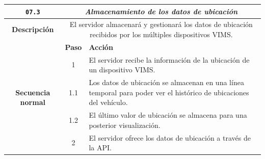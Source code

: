 \begin{table}[H]
  \centering
  \begin{tabularx}{\textwidth}{|c|c|X|}
    \hline
    \texttt{07.3}                              & \multicolumn{2}{c|}{\textit{Almacenamiento de los datos de ubicación}}                                                                                                                                                                                                        \\
    \hline
    \textbf{Descripción}                       & \multicolumn{2}{X|}{El servidor almacenará y gestionará los datos de ubicación recibidos por los múltiples dispositivos \ac{VIMS}.}                                                                                                                                           \\
    \hline
    \multirow{8}{*}{\textbf{Secuencia normal}} & \textbf{Paso}                                                                                                                       & \textbf{Acción}                                                                                                                         \\
    \cline{2-3}
                                               & 1                                                                                                                                   & \multicolumn{1}{L|}{El servidor recibe la información de la ubicación de un dispositivo \ac{VIMS}.}                                     \\
    \cline{2-3}
                                               & 1.1                                                                                                                                 & \multicolumn{1}{L|}{Los datos de ubicación se almacenan en una línea temporal para poder ver el histórico de ubicaciones del vehículo.} \\
    \cline{2-3}
                                               & 1.2                                                                                                                                 & \multicolumn{1}{L|}{El último valor de ubicación se almacena para una posterior visualización.}                                         \\
    \cline{2-3}
                                               & 2                                                                                                                                   & \multicolumn{1}{L|}{El servidor ofrece los datos de ubicación a través de la \ac{API}.}                                                 \\

\end{tabularx}
\end{table}
